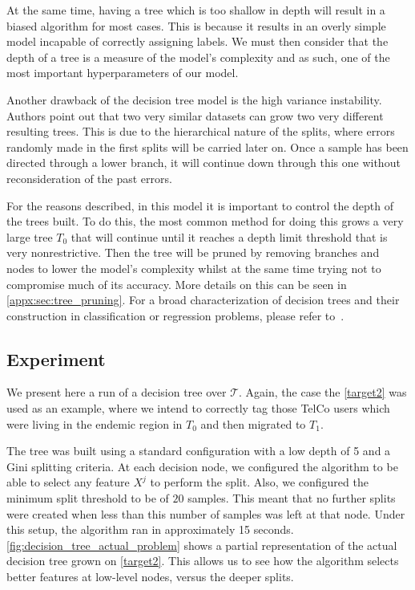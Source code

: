 At the same time, having a tree which is too shallow in depth will result in a biased algorithm  for most cases.
This is because it results in an overly simple model incapable of correctly assigning labels.
We must then consider that the depth of a tree is a measure of the model's complexity and as such, one of the most important hyperparameters of our model.

Another drawback of the decision tree model is the high variance instability.
Authors point out that two very similar datasets can grow two very different resulting trees.
This is due to the hierarchical nature of the splits, where errors randomly made in the first splits will be carried later on.
Once a sample has been directed through a lower branch, it will continue down through this one without reconsideration of the past errors.

For the reasons described, in this model it is important to control the depth of the trees built.
To do this, the most common method for doing this grows a very large tree $T_0$ that will continue until it reaches a depth limit threshold that is very nonrestrictive.
Then the tree will be pruned by removing branches and nodes to lower the model's complexity whilst at the same time trying not to compromise much of its accuracy.
More details on this can be seen in \cref{appx:sec:tree_pruning}.
For a broad characterization of decision trees and their construction in classification or regression problems, please refer to~\citep{breiman-cart84}.

\subsection{Experiment}\label{subsection:decision_trees_experiment}

We present here a run of a decision tree over $\mathcal{T}$.
Again, the case the \cref{target2} was used as an example, where we intend to correctly tag those TelCo users which were living in the endemic region in $T_0$ and then migrated to $T_1$.

The tree was built using a standard configuration with a low depth of 5 and a Gini splitting criteria.
At each decision node, we configured the algorithm to be able to select any feature $X^j$ to perform the split.
Also, we configured the minimum split threshold to be of $20$ samples.
This meant that no further splits were created when less than this number of samples was left at that node.
Under this setup, the algorithm ran in approximately 15 seconds.
\cref{fig:decision_tree_actual_problem} shows a partial representation of the actual decision tree grown on \cref{target2}.
This allows us to see how the algorithm selects better features at low-level nodes, versus the deeper splits.

